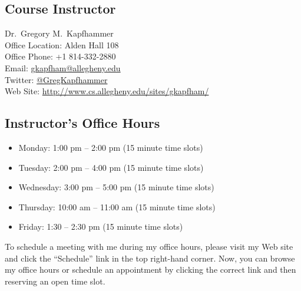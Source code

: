 

\usepackage{booktabs}
\renewcommand{\arraystretch}{1.2}




\vspace*{-.2in}
\subsection*{Course Instructor}
Dr.\ Gregory M.\ Kapfhammer\\
\noindent Office Location: Alden Hall 108 \\
\noindent Office Phone: +1 814-332-2880 \\
\noindent Email: \url{gkapfham@allegheny.edu} \\
\noindent Twitter: \url{@GregKapfhammer} \\
\noindent Web Site: \url{http://www.cs.allegheny.edu/sites/gkapfham/}

\vspace*{-.1in}
\subsection*{Instructor's Office Hours}

\begin{itemize}
  \itemsep -.05em
  \item Monday: 1:00 pm -- 2:00 pm (15 minute time slots)
  \item Tuesday: 2:00 pm -- 4:00 pm (15 minute time slots)
  \item Wednesday: 3:00 pm -- 5:00 pm (15 minute time slots)
  \item Thursday: 10:00 am -- 11:00 am (15 minute time slots)
  \item Friday: 1:30 -- 2:30 pm (15 minute time slots)
\end{itemize}
\vspace*{-.1in}

\noindent
To schedule a meeting with me during my office hours, please visit my Web site and click the ``Schedule'' link
in the top right-hand corner. Now, you can browse my office hours or schedule an appointment by clicking the correct
link and then reserving an open time slot.

